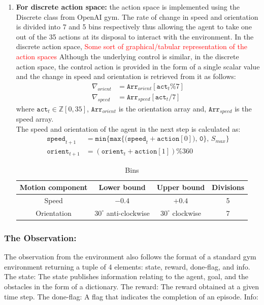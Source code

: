 \begin{enumerate}
    \item \textbf{For discrete action space:} the action space is implemented using the Discrete class from OpenAI gym. The rate of change in speed and orientation is divided into 7 and 5 bins respectively thus allowing the agent to take one out of the 35 actions at its disposal to interact with the environment. In the discrete action space, \textcolor{red}{Some sort of graphical/tabular representation of the action spaces}
    Although the underlying control is similar, in the discrete action space, the control action is provided in the form of  a single scalar value and the change in speed and orientation is retrieved from it as follows:\\
    \begin{align}
	    \nabla_{orient} & = \texttt{Arr}_{orient}[\texttt{act}_{t}\%7]\\
	    \nabla_{speed} & = \texttt{Arr}_{speed}[\texttt{act}_{t}/7]   
    \end{align}
    where $\texttt{act}_{t} \in \mathbb{Z} [ 0, 35]$, $\texttt{Arr}_{orient}$ is the orientation array and, $\texttt{Arr}_{speed}$ is the speed array.\\
    The speed and orientation of the agent in the next step is calculated as:
    \begin{align}
		\label{eq:next_state_agent}
		\texttt{speed}_{t+1} & =\texttt{min\{} \texttt{max\{(}\texttt{speed}_{t} + \texttt{action}[0]\texttt{), 0\}, } S_{max}\}\\
		\label{eq:next_state_agent2}
		\texttt{orient}_{t+1} & = (\texttt{orient}_{t} + \texttt{action}[1]) \% 360
	\end{align}
\begin{table}[tbhp]
	\caption{Bins}
	\label{tab:env_action_divisions}
	\begin{center}
		\begin{tabular}{|c|c|c|c|}
			\hline
			Motion component & Lower bound & Upper bound & Divisions \\
			\hline
			\hline
			Speed & $-0.4$ &  $+0.4$ & 5 \\
			Orientation & $30^{\circ}$ anti-clockwise & $30^{\circ}$ clockwise & 7\\
			\hline
		\end{tabular}
	\end{center}
\end{table}
\end{enumerate}
\subsubsection{The Observation:}
The observation from the environment also follows the format of a standard gym environment returning a tuple of 4 elements: state, reward, done-flag, and info.
The state:
The state publishes information relating to the agent, goal, and the obstacles in the form of a dictionary.
The reward:
The reward obtained at a given time step.
The done-flag:
A flag that indicates the completion of an episode.
Info:
